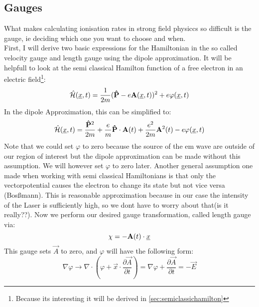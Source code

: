 \subsection{Gauges}
What makes calculating ionisation rates in strong field physiccs so difficult is the gauge, ie deciding which one you want to choose and when. \\
First, I will derive two basic expressions for the Hamiltonian in the so called velocity gauge and length gauge using the dipole approximation.
It will be helpfull to look at the semi classical Hamilton function of a free electron in an electric field\footnote{Because its interesting it will be derived in \ref{sec:semiclassichamilton}}: %
\begin{equation} %
    \hat{\Hs}(\uvec{x}, t) = \frac{1}{2m}(\vec{\hat{P}} - e \vec{A}(\uvec{x}, t))^2 + e \varphi(\uvec{x}, t)  \label{eq:semiClassicalHamilton}    %
\end{equation}
In the dipole Approximation, this can be simplified to:
\begin{equation*}
    \hat{\Hs}(\uvec{x}, t) = \frac{\vec{\hat{P}}^2}{2m} + \frac{e}{m}\vec{\hat{P}}\cdot \vec{A}(t) + \frac{e^2}{2m}\vec{A}^2(t) - e \varphi(\uvec{x}, t) %
\end{equation*}
Note that we could set $\varphi$ to zero because the source of the em wave are outside of our region of interest but the dipole approximation can be made without this assumption. 
We will however set $\varphi$ to zero later. 
Another general assumption one made when working with semi classical Hamiltonians is that only the vectorpotential causes the electron to change its state but not vice versa (Bosßmann). 
This is reasonable approximation because in our case the intensity of the Laser is sufficiently high, so we dont have to worry about that(is it really??).
Now we perform our desired gauge transformation, called length gauge via:
\begin{equation*}
    \chi = -\vec{A}(t)\cdot \uvec{x} %
\end{equation*}
This gauge sets $\vec{A}$ to zero, and $\varphi$ will have the following form:
\begin{equation*}
    \nabla \varphi \to \nabla \cdot (\varphi + \vec{x} \cdot \frac{\partial \vec{A}}{\partial t}) = \nabla \varphi + \frac{\partial \vec{A}}{\partial t} = - \vec{E}
\end{equation*}%
